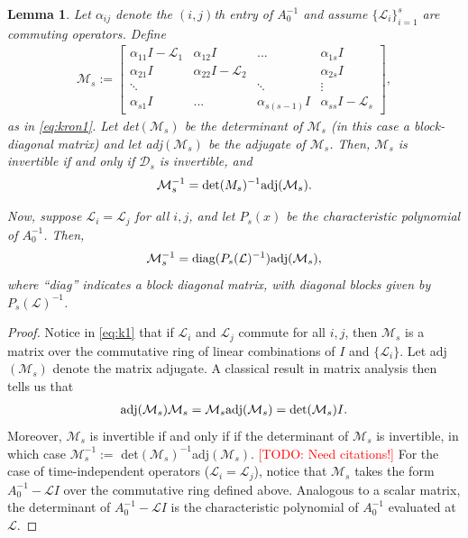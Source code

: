 \documentclass[a4paper,10pt]{article}
\makeatletter
\newtheorem{lemma}{Lemma}
\newcommand{\todo}[1]{\textcolor{red}{[TODO\@: #1]}}
\makeatother
\begin{document}
%
\begin{lemma}
Let $\alpha_{ij}$ denote the $(i,j)$th entry of $A_0^{-1}$ and assume $\{\mathcal{L}_i\}_{i=1}^s$
are commuting operators. Define 
\begin{align}\label{eq:k1}
\mathcal{M}_s := \begin{bmatrix} \alpha_{11}I - \mathcal{L}_1 & \alpha_{12}I & ... & \alpha_{1s}I \\
	\alpha_{21}I & \alpha_{22}I - \mathcal{L}_2 & & \alpha_{2s}I \\
	\ddots & & \ddots & \vdots \\ \alpha_{s1}I & ... & \alpha_{s(s-1)}I & \alpha_{ss}I - \mathcal{L}_s \end{bmatrix},
\end{align}
as in \eqref{eq:kron1}.
Let det$(\mathcal{M}_s)$ be the determinant of $\mathcal{M}_s$ (in this case a block-diagonal
matrix) and let adj$(\mathcal{M}_s)$ be the adjugate of $\mathcal{M}_s$. Then, $\mathcal{M}_s$
is invertible if and only if $\mathcal{D}_s$ is invertible, and
\begin{align*}
\mathcal{M}_s^{-1} = \textnormal{det}({M}_s)^{-1}\textnormal{adj}(\mathcal{M}_s).
\end{align*}

Now, suppose $\mathcal{L}_i = \mathcal{L}_j$ for all $i,j$, and let $P_s(x)$ be the
characteristic polynomial of $A_0^{-1}$. Then,
\begin{align*}
\mathcal{M}_s^{-1} = \textnormal{diag}(P_s(\mathcal{L})^{-1})\textnormal{adj}(\mathcal{M}_s),
\end{align*}
where ``diag'' indicates a block diagonal matrix, with diagonal blocks given by $P_s(\mathcal{L})^{-1}$.
\end{lemma}
%
\begin{proof}
Notice in \eqref{eq:k1} that if $\mathcal{L}_i$ and $\mathcal{L}_j$ commute for all $i,j$,
then $\mathcal{M}_s$ is a matrix over the commutative ring of linear combinations
of $I$ and $\{\mathcal{L}_i\}$. Let adj$(\mathcal{M}_s)$ denote the matrix adjugate. A
classical result in matrix analysis then tells us that
%
\begin{align*} 
\textnormal{adj}(\mathcal{M}_s)\mathcal{M}_s = \mathcal{M}_s\textnormal{adj}(\mathcal{M}_s)
	= \textnormal{det}(\mathcal{M}_s)I.
\end{align*}
%
Moreover, $\mathcal{M}_s$ is invertible if and only if if the determinant of $\mathcal{M}_s$
is invertible, in which case $\mathcal{M}_s^{-1} := $ det$(\mathcal{M}_s)^{-1}$adj$(\mathcal{M}_s)$.
\todo{Need citations!}
For the case of time-independent operators ($\mathcal{L}_i=\mathcal{L}_j$), notice that
$\mathcal{M}_s$ takes the form $A_0^{-1} - \mathcal{L}I$ over the commutative ring defined
above. Analogous to a scalar matrix, the determinant of $A_0^{-1} - \mathcal{L}I$ is the
characteristic polynomial of $A_0^{-1}$ evaluated at $\mathcal{L}$.
\end{proof}
%
\end{document}
